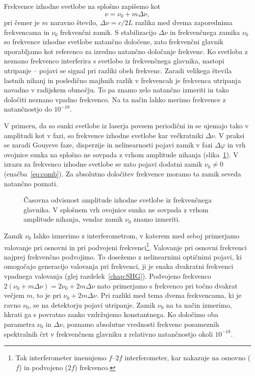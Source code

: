 Frekvence izhodne svetlobe na splošno zapišemo kot 
\begin{equation}
\nu = \nu_0 + m\Delta \nu,
\label{eq:comb}
\end{equation}
pri čemer je $m$ naravno število, $\Delta \nu = c/2L$ razlika med dvema zaporednima 
frekvencama in $\nu_0$ frekvenčni zamik. S stabilizacijo $\Delta \nu$ in 
frekvenčnega zamika $\nu_0$ so frekvence izhodne svetlobe  
natančno določene, zato frekvenčni glavnik uporabljamo kot referenco 
za izredno natančno določanje frekvenc. Ko svetloba z neznano frekvenco
interferira s svetlobo iz frekvenčnega glavnika, nastopi utripanje -- pojavi
se signal pri razliki obeh frekvenc. Zaradi velikega števila lastnih nihanj 
in posledično majhnih razlik v frekvencah je frekvenca utripanja navadno v 
radijskem območju. To pa znamo zelo natančno izmeriti in tako določiti neznano 
vpadno frekvenco. Na ta način lahko merimo frekvence z natančnostjo do 
$10^{-18}$.

V primeru, da so sunki svetlobe iz laserja povsem periodični in se ujemajo tako
v amplitudi kot v fazi, so frekvence izhodne svetlobe kar 
večkratniki $\Delta \nu$. V praksi se zaradi Gouyeve faze,
disperzije in nelinearnosti pojavi zamik
v fazi $\Delta \varphi$ in vrh ovojnice sunka na splošno ne sovpada z vrhom amplitude
nihanja (slika~\ref{fig:comb2}). V izrazu za
frekvenco izhodne svetlobe se zato pojavi dodatni zamik $\nu_0 \neq 0$ (enačba~\ref{eq:comb}). 
Za absolutno
določitev frekvence moramo ta zamik seveda natančno poznati. 
\begin{figure}[h]
\centering
\def\svgwidth{110truemm} 

\caption{Časovna odvisnost amplitude izhodne svetlobe iz frekvenčnega glavnika. V splošnem
vrh ovojnice sunka ne sovpada z vrhom amplitude nihanja, vendar zamik $\nu_0$ znamo izmeriti.}
\label{fig:comb2}
\end{figure}

Zamik $\nu_0$ lahko izmerimo
z interferometrom, v katerem med seboj primerjamo valovanje pri 
osnovni in pri podvojeni frekvenci\footnote{Tak interferometer imenujemo $f$--$2f$
interferometer, kar nakazuje na osnovno ($f$)  in podvojeno ($2f$) frekvenco.}.
Valovanje pri osnovni frekvenci najprej frekvenčno podvojimo. To dosežemo 
z nelinearnimi optičnimi pojavi, ki omogočajo generacijo valovanja pri frekvenci, 
ji je enaka dvakratni frekvenci vpadnega valovanja 
(glej razdelek~\ref{chap:SHG}). Podvojeno frekvenco $2(\nu_0 + 
m\Delta \nu)= 2\nu_0 + 2m\Delta \nu$ nato primerjamo s frekvenco pri 
točno dvakrat večjem $m$, to je pri $\nu_0 + 2m\Delta \nu$. Pri razliki med tema
dvema frekvencama, ki je ravno $\nu_0$, se na detektorju pojavi utripanje.
Zamik $\nu_0$ na ta način izmerimo, hkrati ga s povratno zanko
vzdržujemo konstantnega. Ko določimo oba parametra $\nu_0$ in $\Delta \nu$, 
poznamo absolutne vrednosti frekvenc posameznih spektralnih črt v frekvenčnem 
glavniku z relativno natančnostjo okoli $10^{-18}$.

